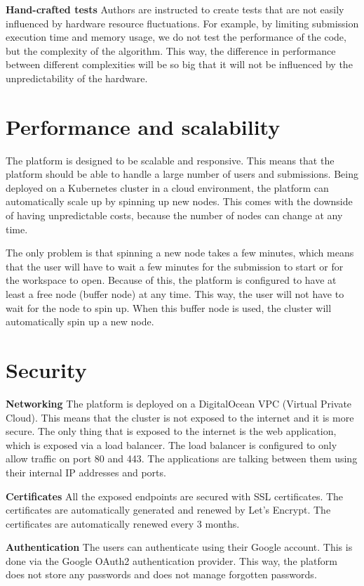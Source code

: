 \documentclass[12pt,a4paper]{report}
\begin{document}
\textbf{Hand-crafted tests}
Authors are instructed to create tests that are not easily influenced by hardware resource fluctuations. For example, by limiting submission execution time and memory usage, we do not test the performance of the code, but the complexity of the algorithm. This way, the difference in performance between different complexities will be so big that it will not be influenced by the unpredictability of the hardware.


\section{Performance and scalability}
The platform is designed to be scalable and responsive. This means that the platform should be able to handle a large number of users and submissions. Being deployed on a Kubernetes cluster in a cloud environment, the platform can automatically scale up by spinning up new nodes. This comes with the downside of having unpredictable costs, because the number of nodes can change at any time.

The only problem is that spinning a new node takes a few minutes, which means that the user will have to wait a few minutes for the submission to start or for the workspace to open. Because of this, the platform is configured to have at least a free node (buffer node) at any time. This way, the user will not have to wait for the node to spin up. When this buffer node is used, the cluster will automatically spin up a new node.

\section{Security}
\textbf{Networking}
The platform is deployed on a DigitalOcean VPC (Virtual Private Cloud). This means that the cluster is not exposed to the internet and it is more secure. The only thing that is exposed to the internet is the web application, which is exposed via a load balancer. The load balancer is configured to only allow traffic on port 80 and 443. The applications are talking between them using their internal IP addresses and ports.

\textbf{Certificates}
All the exposed endpoints are secured with SSL certificates. The certificates are automatically generated and renewed by Let's Encrypt. The certificates are automatically renewed every 3 months.

\textbf{Authentication}
The users can authenticate using their Google account. This is done via the Google OAuth2 authentication provider. This way, the platform does not store any passwords and does not manage forgotten passwords.
\end{document}

